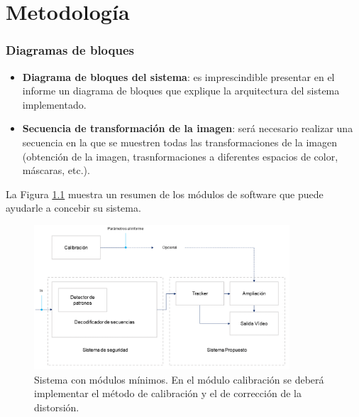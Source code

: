 \chapter{\textbf{Metodología}}
\label{chapter:metodologia}

\subsection*{Diagramas de bloques}
{}
\vspace{5mm}

\begin{itemize}
    \item \textbf{Diagrama de bloques del sistema}: es imprescindible presentar en el informe un diagrama de bloques que explique la arquitectura del sistema implementado.
    \item \textbf{Secuencia de transformación de la imagen}: será necesario realizar una secuencia en la que se muestren todas las transformaciones de la imagen (obtención de la imagen, trasnformaciones a diferentes espacios de color, máscaras, etc.).
\end{itemize}

La Figura \ref{fig:diagrama} muestra un resumen de los módulos de software que puede ayudarle a concebir su sistema.

\begin{figure}[H]
    \centering
    \includegraphics[width=0.85\textwidth]{Lab_Project/template/figures/diagrama.png}
    \caption{Sistema con módulos mínimos. En el módulo calibración se deberá implementar el método de calibración y el de corrección de la distorsión.}
    \label{fig:diagrama}
\end{figure}